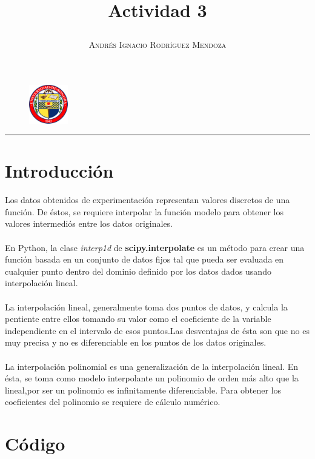 \documentclass[11pt,spanish]{article}
\title{\vspace{-3cm}\begin{flushleft}\textbf{Actividad 3}\end{flushleft}}
\author{\hspace{-9.6cm}\textsc{Andrés Ignacio Rodríguez Mendoza}}
\date{}
\begin{document}
\begin{figure}
  \begin{center}
   \vspace{-5.4cm} \includegraphics[width=0.15\textwidth]{uni}
  \end{center}
\end{figure}

\maketitle  
\begin{center}
\rule{\textwidth}{1pt}
\end{center}

\section*{Introducción}

Los datos obtenidos de experimentación representan valores discretos de una función. De éstos, se requiere interpolar la función modelo para obtener los valores intermediós entre los datos originales.\\ \\
En Python, la clase \textit{interp1d} de \textbf{scipy.interpolate} es un método para crear una función basada en un conjunto de datos fijos tal que pueda ser evaluada en cualquier punto dentro del dominio definido por los datos dados usando interpolación lineal.\\ \\
La interpolación lineal, generalmente toma dos puntos de datos, y calcula la pentiente entre ellos tomando su valor como el coeficiente de la variable independiente en el intervalo de esos puntos.Las desventajas de ésta son que no es muy precisa y no es diferenciable en los puntos de los datos originales.\\ \\
La interpolación polinomial es una generalización de la interpolación lineal. En ésta, se toma como modelo interpolante un polinomio de orden más alto que la lineal,por ser un polinomio es infinitamente diferenciable. Para obtener los coeficientes del polinomio se requiere de cálculo numérico.

\section*{Código}
\end{document}
